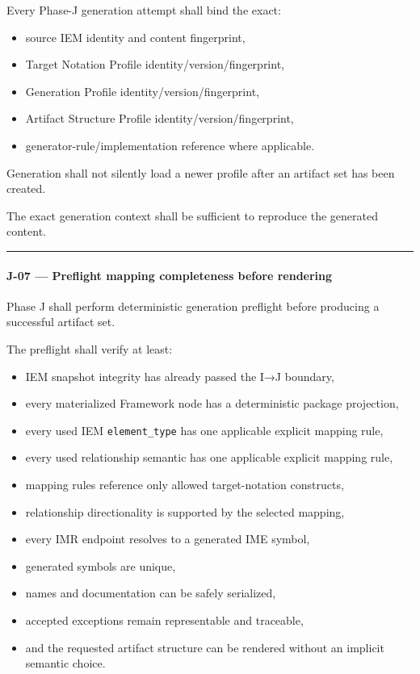 Every Phase-J generation attempt shall bind the exact:

\begin{itemize}
\tightlist
\item
  source IEM identity and content fingerprint,
\item
  Target Notation Profile identity/version/fingerprint,
\item
  Generation Profile identity/version/fingerprint,
\item
  Artifact Structure Profile identity/version/fingerprint,
\item
  generator-rule/implementation reference where applicable.
\end{itemize}

Generation shall not silently load a newer profile after an artifact set has been created.

The exact generation context shall be sufficient to reproduce the generated content.

\begin{center}\rule{0.5\linewidth}{0.5pt}\end{center}

\hypertarget{j-07--preflight-mapping-completeness-before-rendering}{%
\paragraph{J-07 --- Preflight mapping completeness before rendering}\label{j-07--preflight-mapping-completeness-before-rendering}}

Phase J shall perform deterministic generation preflight before producing a successful artifact set.

The preflight shall verify at least:

\begin{itemize}
\tightlist
\item
  IEM snapshot integrity has already passed the I→J boundary,
\item
  every materialized Framework node has a deterministic package projection,
\item
  every used IEM \texttt{element\_type} has one applicable explicit mapping rule,
\item
  every used relationship semantic has one applicable explicit mapping rule,
\item
  mapping rules reference only allowed target-notation constructs,
\item
  relationship directionality is supported by the selected mapping,
\item
  every IMR endpoint resolves to a generated IME symbol,
\item
  generated symbols are unique,
\item
  names and documentation can be safely serialized,
\item
  accepted exceptions remain representable and traceable,
\item
  and the requested artifact structure can be rendered without an implicit semantic choice.
\end{itemize}


